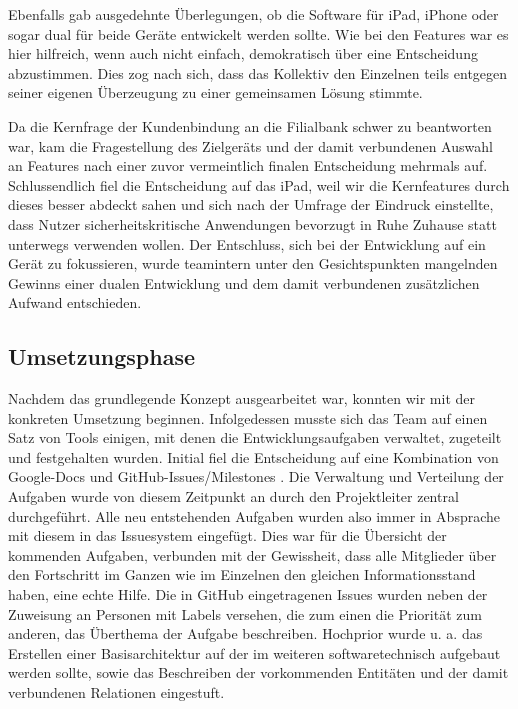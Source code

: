 	Ebenfalls gab ausgedehnte Überlegungen, ob die Software für iPad, iPhone oder sogar dual für beide Geräte entwickelt werden sollte. Wie bei den Features war es hier hilfreich, wenn auch nicht einfach, demokratisch über eine Entscheidung abzustimmen. Dies zog nach sich, dass das Kollektiv den Einzelnen teils entgegen seiner eigenen Überzeugung zu einer gemeinsamen Lösung stimmte. 
	
	Da die Kernfrage der Kundenbindung an die Filialbank schwer zu beantworten war, kam die Fragestellung des Zielgeräts und der damit verbundenen Auswahl an Features nach einer zuvor vermeintlich finalen Entscheidung mehrmals auf. Schlussendlich fiel die Entscheidung auf das iPad, weil wir die Kernfeatures durch dieses besser abdeckt sahen und sich nach der Umfrage der Eindruck einstellte, dass Nutzer sicherheitskritische Anwendungen bevorzugt in Ruhe Zuhause statt unterwegs verwenden wollen. Der Entschluss, sich bei der Entwicklung auf ein Gerät zu fokussieren, wurde teamintern unter den Gesichtspunkten mangelnden Gewinns einer dualen Entwicklung und dem damit verbundenen zusätzlichen Aufwand entschieden.

\subsection{Umsetzungsphase}
	Nachdem das grundlegende Konzept ausgearbeitet war, konnten wir mit der konkreten Umsetzung beginnen. Infolgedessen musste sich das Team auf einen Satz von Tools einigen, mit denen die Entwicklungsaufgaben verwaltet, zugeteilt und festgehalten wurden. Initial fiel die Entscheidung auf eine Kombination von Google-Docs und GitHub-Issues/Milestones \citep{GitHubIssues11} \citep{GitHubFeatures14}. Die Verwaltung und Verteilung der Aufgaben wurde von diesem Zeitpunkt an durch den Projektleiter zentral durchgeführt. Alle neu entstehenden Aufgaben wurden also immer in Absprache mit diesem in das Issuesystem eingefügt. Dies war für die Übersicht der kommenden Aufgaben, verbunden mit der Gewissheit, dass alle Mitglieder über den Fortschritt im Ganzen wie im Einzelnen den gleichen Informationsstand haben, eine echte Hilfe. Die in GitHub eingetragenen Issues wurden neben der Zuweisung an Personen mit Labels versehen, die zum einen die Priorität zum anderen, das Überthema der Aufgabe beschreiben. Hochprior wurde u. a. das Erstellen einer Basisarchitektur auf der im weiteren softwaretechnisch aufgebaut werden sollte, sowie das Beschreiben der vorkommenden Entitäten und der damit verbundenen Relationen eingestuft. 

